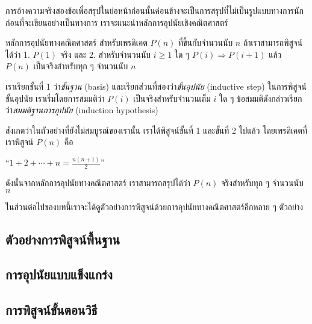 การ{\wbr}อ้าง{\wbr}ความจริง{\wbr}สอง{\wbr}ข้อ{\wbr}เพื่อ{\wbr}สรุป{\wbr}ใน{\wbr}ย่อหน้า{\wbr}ก่อน{\wbr}นั้น{\wbr}ค่อนข้าง{\wbr}จะ{\wbr}เป็น{\wbr}การ{\wbr}สรุป{\wbr}ที่{\wbr}ไม่{\wbr}เป็น{\wbr}รูปแบบ{\wbr}ทางการ{\wbr}นัก ก่อน{\wbr}ที่{\wbr}จะ{\wbr}เขียน{\wbr}อย่าง{\wbr}เป็นทางการ เรา{\wbr}จะ{\wbr}แนะนำ{\wbr}หลักการ{\wbr}อุปนัย{\wbr}เชิง{\wbr}คณิตศาสตร์{\wbr}

    หลักการ{\wbr}อุปนัย{\wbr}ทาง{\wbr}คณิตศาสตร์{\wbr}
    สำหรับ{\wbr}เพรดิเคต $ P(n) $ ที่{\wbr}ขึ้น{\wbr}กับ{\wbr}จำนวนนับ $ n $ ถ้า{\wbr}เรา{\wbr}สามารถ{\wbr}พิสูจน์{\wbr}ได้{\wbr}ว่า{\wbr}
    1. $ P(1) $ จริง และ{\wbr}
    2. สำหรับ{\wbr}จำนวนนับ $ i\geq 1 $ ใด ๆ $ P(i)\Rightarrow P(i+1) $
    แล้ว $ P(n) $ เป็นจริง{\wbr}สำหรับ{\wbr}ทุก ๆ จำนวนนับ $ n $

เรา{\wbr}เรียก{\wbr}ขั้น{\wbr}ที่ 1 ว่า{\em ขั้น{\wbr}ฐาน} (basis) และ{\wbr}เรียก{\wbr}ส่วน{\wbr}ที่{\wbr}สอง{\wbr}ว่า{\em ขั้น{\wbr}อุปนัย}
(inductive step) ใน{\wbr}การ{\wbr}พิสูจน์{\wbr}ขั้น{\wbr}อุปนัย เรา{\wbr}เริ่ม{\wbr}โดย{\wbr}การ{\wbr}สมมติ{\wbr}ว่า $ P(i) $
เป็นจริง{\wbr}สำหรับ{\wbr}จำนวนเต็ม $ i $ ใด ๆ ข้อสมมติ{\wbr}ดังกล่าว{\wbr}เรียก{\wbr}ว่า{\em สมมติฐาน{\wbr}การ{\wbr}อุปนัย}
(induction hypothesis)

สังเกต{\wbr}ว่า{\wbr}ใน{\wbr}ตัวอย่าง{\wbr}ที่{\wbr}ยัง{\wbr}ไม่{\wbr}สมบูรณ์{\wbr}ของ{\wbr}เรา{\wbr}นั้น เรา{\wbr}ได้{\wbr}พิสูจน์{\wbr}ขั้น{\wbr}ที่ 1 และ{\wbr}ขั้น{\wbr}ที่ 2 ไป{\wbr}แล้ว{\wbr}
โดย{\wbr}เพรดิเคต{\wbr}ที่{\wbr}เรา{\wbr}พิสูจน์ $ P(n) $ คือ{\wbr}

\begin{center}
``$ 1+2+\cdots+n = \frac{n(n+1)}{2} $''
\end{center}

ดังนั้น{\wbr}จาก{\wbr}หลักการ{\wbr}อุปนัย{\wbr}ทาง{\wbr}คณิตศาสตร์ เรา{\wbr}สามารถ{\wbr}สรุป{\wbr}ได้{\wbr}ว่า $ P(n) $ จริง{\wbr}สำหรับ{\wbr}ทุก ๆ
จำนวนนับ $ n $

ใน{\wbr}ส่วนต่อ{\wbr}ไป{\wbr}ของ{\wbr}บท{\wbr}นี้{\wbr}เรา{\wbr}จะ{\wbr}ได้{\wbr}ดู{\wbr}ตัวอย่าง{\wbr}การ{\wbr}พิสูจน์{\wbr}ด้วย{\wbr}การ{\wbr}อุปนัย{\wbr}ทาง{\wbr}คณิตศาสตร์{\wbr}อีก{\wbr}หลาย ๆ ตัวอย่าง{\wbr}

\subsection{ตัวอย่าง{\wbr}การ{\wbr}พิสูจน์{\wbr}พื้นฐาน}

\subsection{การ{\wbr}อุปนัย{\wbr}แบบ{\wbr}แข็งแกร่ง}

\subsection{การ{\wbr}พิสูจน์{\wbr}ขั้นตอนวิธี}

